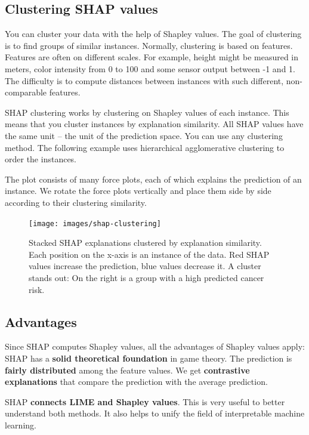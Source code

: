 \documentclass[12pt,]{krantz}
\begin{document}
\subsection{Clustering SHAP values}\label{clustering-shap-values}

You can cluster your data with the help of Shapley values. The goal of
clustering is to find groups of similar instances. Normally, clustering
is based on features. Features are often on different scales. For
example, height might be measured in meters, color intensity from 0 to
100 and some sensor output between -1 and 1. The difficulty is to
compute distances between instances with such different, non-comparable
features.

SHAP clustering works by clustering on Shapley values of each instance.
This means that you cluster instances by explanation similarity. All
SHAP values have the same unit -- the unit of the prediction space. You
can use any clustering method. The following example uses hierarchical
agglomerative clustering to order the instances.

The plot consists of many force plots, each of which explains the
prediction of an instance. We rotate the force plots vertically and
place them side by side according to their clustering similarity.

\begin{figure}

{\centering \texttt{[image: images/shap-clustering]} 

}

\caption{Stacked SHAP explanations clustered by explanation similarity. Each position on the x-axis is an instance of the data. Red SHAP values increase the prediction, blue values decrease it. A cluster stands out: On the right is a group with a high predicted cancer risk.}\label{fig:unnamed-chunk-49}
\end{figure}

\subsection{Advantages}\label{advantages-17}

Since SHAP computes Shapley values, all the advantages of Shapley values
apply: SHAP has a \textbf{solid theoretical foundation} in game theory.
The prediction is \textbf{fairly distributed} among the feature values.
We get \textbf{contrastive explanations} that compare the prediction
with the average prediction.

SHAP \textbf{connects LIME and Shapley values}. This is very useful to
better understand both methods. It also helps to unify the field of
interpretable machine learning.
\end{document}
